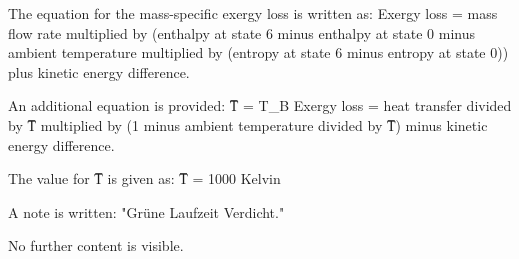 The equation for the mass-specific exergy loss is written as:  
Exergy loss = mass flow rate multiplied by (enthalpy at state 6 minus enthalpy at state 0 minus ambient temperature multiplied by (entropy at state 6 minus entropy at state 0)) plus kinetic energy difference.  

An additional equation is provided:  
T̅ = T_B  
Exergy loss = heat transfer divided by T̅ multiplied by (1 minus ambient temperature divided by T̅) minus kinetic energy difference.  

The value for T̅ is given as:  
T̅ = 1000 Kelvin  

A note is written:  
"Grüne Laufzeit Verdicht."  

No further content is visible.